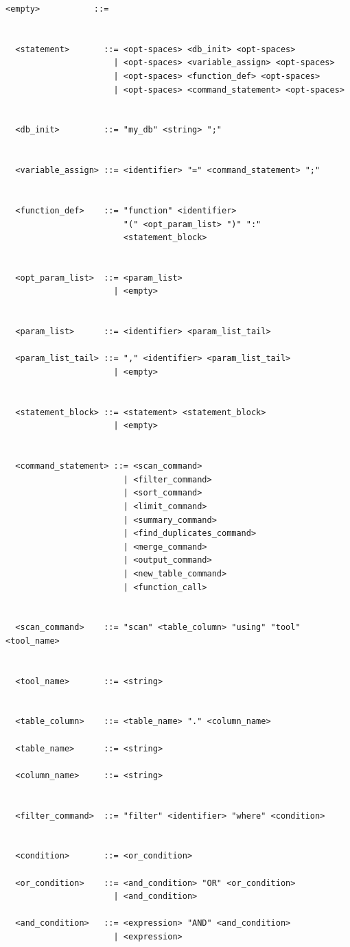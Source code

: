 \begin{itemize}[label=-, noitemsep]
\begin{lstlisting}[style=bnf, caption={Complete BNF grammar of DaQuVa.}, label={lst:bnf}]
  <empty>           ::=
  
  
  <statement>       ::= <opt-spaces> <db_init> <opt-spaces>
                      | <opt-spaces> <variable_assign> <opt-spaces>
                      | <opt-spaces> <function_def> <opt-spaces>
                      | <opt-spaces> <command_statement> <opt-spaces>
  
  
  <db_init>         ::= "my_db" <string> ";"
  
  
  <variable_assign> ::= <identifier> "=" <command_statement> ";"
  
  
  <function_def>    ::= "function" <identifier>
                        "(" <opt_param_list> ")" ":"
                        <statement_block>
  
  
  <opt_param_list>  ::= <param_list>
                      | <empty>
  
  
  <param_list>      ::= <identifier> <param_list_tail>
  
  <param_list_tail> ::= "," <identifier> <param_list_tail>
                      | <empty>
  
  
  <statement_block> ::= <statement> <statement_block>
                      | <empty>
  
  
  <command_statement> ::= <scan_command>
                        | <filter_command>
                        | <sort_command>
                        | <limit_command>
                        | <summary_command>
                        | <find_duplicates_command>
                        | <merge_command>
                        | <output_command>
                        | <new_table_command>
                        | <function_call>
  
  
  <scan_command>    ::= "scan" <table_column> "using" "tool" <tool_name>
  
  
  <tool_name>       ::= <string>
  
  
  <table_column>    ::= <table_name> "." <column_name>
  
  <table_name>      ::= <string>
  
  <column_name>     ::= <string>
  
  
  <filter_command>  ::= "filter" <identifier> "where" <condition>
  
  
  <condition>       ::= <or_condition>

  <or_condition>    ::= <and_condition> "OR" <or_condition>
                      | <and_condition>

  <and_condition>   ::= <expression> "AND" <and_condition>
                      | <expression>


\end{lstlisting}
\end{itemize}
